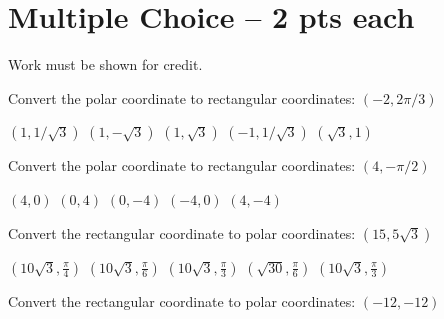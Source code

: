 \documentclass[11pt,answers]{exam}
\begin{document}
\section*{Multiple Choice -- 2 pts each}
{\large Work must be shown for credit.}
\vspace{2ex}
\begin{questions}
	\begin{minipage}{\linewidth}
		\question Convert the polar coordinate to rectangular coordinates: $(-2, 2\pi/3)$

\begin{choices}
	\choice $\left(1,1/\sqrt{3}\right)$
	\CorrectChoice $\left(1,-\sqrt{3}\right)$
	\choice $\left(1,\sqrt{3}\right)$
	\choice $\left(-1,1/\sqrt{3}\right)$
	\choice $\left(\sqrt{3},1\right)$

\end{choices} \answerline
\end{minipage}

\begin{minipage}{\linewidth}
\question Convert the polar coordinate to rectangular coordinates: $(4,-\pi/2)$

\begin{choices}
	\choice $\left(4,0\right)$
	\choice $\left(0,4\right)$
	\CorrectChoice $\left(0,-4\right)$
	\choice $\left(-4,0\right)$
	\choice $\left(4,-4\right)$
\end{choices} \answerline
\end{minipage}

\begin{minipage}{\linewidth}



\question Convert the rectangular coordinate to polar coordinates: $(15, 5\sqrt{3})$

\begin{choices}
	\choice $\left(10 \sqrt{3},\frac{\pi }{4}\right)$
	\CorrectChoice $\left(10 \sqrt{3},\frac{\pi }{6}\right)$
	\choice $\left(10 \sqrt{3},\frac{\pi }{3}\right)$
	\choice $\left(\sqrt{30},\frac{\pi }{6}\right)$
	\choice $\left(10 \sqrt{3},\frac{\pi }{3}\right)$

\end{choices} \answerline
\end{minipage}

\begin{minipage}{\linewidth}



\question Convert the rectangular coordinate to polar coordinates: $(-12, -12)$


\end{minipage}
\end{questions}
\end{document}
